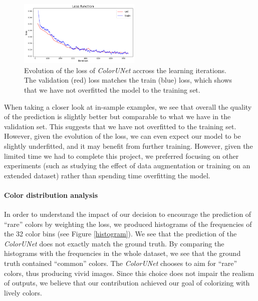 \documentclass[10pt,twocolumn,letterpaper]{article}
\begin{document}
\begin{figure}
\begin{center}
\includegraphics[width=220px]{lossplot}
\caption{Evolution of the loss of \textit{ColorUNet} accross the learning iterations. The validation (red) loss matches the train (blue) loss, which shows that we have not overfitted the model to the training set.}
\label{lossplot}
\end{center}
\end{figure}

When taking a closer look at in-sample examples, we see that overall the quality of the prediction is slightly better but comparable to what we have in the validation set. This suggests that we have not overfitted to the training set. However, given the evolution of the loss, we can even expect our model to be slightly underfitted, and it may benefit from further training. However, given the limited time we had to complete this project, we preferred focusing on other experiments (such as studying the effect of data augmentation or training on an extended dataset) rather than spending time overfitting the model.


\paragraph{Color distribution analysis}


In order to understand the impact of our decision to encourage the prediction of ``rare'' colors by weighting the loss, we produced histograms of the frequencies of the 32 color bins (see Figure \ref{histogram}). We see that the prediction of the \textit{ColorUNet} does not exactly match the ground truth. By comparing the histograms with the frequencies in the whole dataset, we see that the ground truth contained ``common'' colors. The \textit{ColorUNet} chooses to aim for ``rare'' colors, thus producing vivid images. Since this choice does not impair the realism of outputs, we believe that our contribution achieved our goal of colorizing with lively colors.
\end{document}
